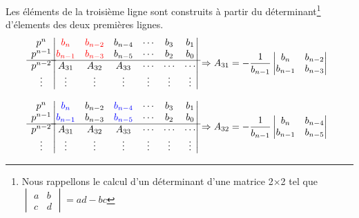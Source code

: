 Les éléments de la troisième ligne sont construits à partir du 
déterminant\footnote{Nous rappellons le calcul d'un déterminant d'une matrice 
2$\times$2 tel que $\begin{vmatrix} a & b \\ c & d \end{vmatrix}=ad-bc$} d'élements des deux premières lignes.
\[
\begin{matrix}
    p^n    \\
    p^{n-1}\\
    \hline
    p^{n-2}\\
    \vdots \\
\end{matrix}
\begin{vmatrix}
    \textcolor{red}{b_n}       & \textcolor{red}{b_{n-2}}    & b_{n-4}    & \cdots & b_3            & b_1         \\
    \textcolor{red}{b_{n-1}}   & \textcolor{red}{b_{n-3}}    & b_{n-5}    & \cdots & b_2            & b_0         \\
    \hline
    A_{31}  & A_{32}     & A_{33}     & \cdots & \cdots         & \cdots      \\
    \vdots    & \vdots     & \vdots     & \vdots & \vdots         & \vdots      \\
\end{vmatrix}
\Rightarrow
A_{31}=-\dfrac{1}{b_{n-1}}\begin{vmatrix} b_{n}  & b_{n-2} \\ b_{n-1} & b_{n-3}\end{vmatrix}
\]

\[
\begin{matrix}
    p^n    \\
    p^{n-1}\\
    \hline
    p^{n-2}\\
    \vdots \\
\end{matrix}
\begin{vmatrix}
    \textcolor{blue}{b_n}       & b_{n-2}    & \textcolor{blue}{b_{n-4}}    & \cdots & b_3            & b_1         \\
    \textcolor{blue}{b_{n-1}}   & b_{n-3}    & \textcolor{blue}{b_{n-5}}    & \cdots & b_2            & b_0         \\
    \hline
    A_{31}    & A_{32}     & A_{33}     & \cdots & \cdots         & \cdots      \\
    \vdots    & \vdots     & \vdots     & \vdots & \vdots         & \vdots      \\
\end{vmatrix}
\Rightarrow
A_{32}=-\dfrac{1}{b_{n-1}}\begin{vmatrix} b_{n}  & b_{n-4} \\ b_{n-1} & b_{n-5}\end{vmatrix}
\]

